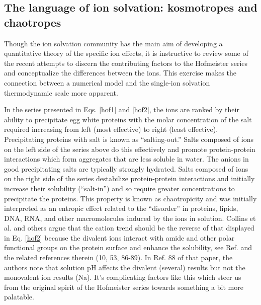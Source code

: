 \begin{intro}
   \subsection{\label{ch1:sec1:level3}The language of ion solvation: kosmotropes and chaotropes}
    Though the ion solvation community has the main aim of developing a quantitative theory of the specific ion effects, it is instructive to review some of the recent attempts to
    discern the contributing factors to the Hofmeister series and conceptualize the differences between the ions. This exercise makes the connection between a numerical model and 
    the single-ion solvation thermodynamic scale more apparent.
     
    In the series presented in Eqs. \ref{hof1} and \ref{hof2}, the ions are ranked by their ability to precipitate egg white proteins with the molar concentration of the salt 
    required increasing from left (most effective) to right (least effective). Precipitating proteins with salt is known as ``salting-out.'' Salts composed of ions on the left side
    of the series above do this effectively and promote protein-protein interactions which form aggregates that are less soluble in water. The anions in good precipitating salts 
    are typically strongly hydrated\cite{collins2004ions}. Salts composed of ions on the right side of the series destabilize protein-protein interactions and initially increase 
    their solubility (``salt-in'') and so require greater concentrations to precipitate the proteins. This property is known as chaotropicity and was initially interpreted as an 
    entropic effect related to the ``disorder'' in proteins, lipids, DNA, RNA, and other macromolecules induced by the ions in solution\cite{abernethy1967franz,ball2015water,hamaguchi1962effect}. 
    Collins et al. and others argue that the cation trend should be the reverse of that displayed in Eq. \ref{hof2} because the divalent ions interact with amide and other polar 
    functional groups on the protein surface and enhance the solubility, see Ref. \cite{collins2004ions} and the related references therein (10, 53, 86-89). In Ref. 88 of that
    paper, the authors note that solution pH affects the divalent (several) results but not the monovalent ion results (Na\sur{+})\cite{arakawa1984mechanism}. It's complicating
    factors like this which steer us from the original spirit of the Hofmeister series towards something a bit more palatable. 


\end{intro}
